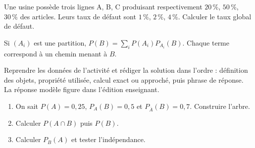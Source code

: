     \begin{activite}
    Une usine possède trois lignes A, B, C produisant respectivement $20\,\%$, $50\,\%$, $30\,\%$ des articles. Leurs taux de défaut sont $1\,\%$, $2\,\%$, $4\,\%$. Calculer le taux global de défaut.
    \begin{center}\end{center}
    \end{activite}

    \begin{traceecrite}Si $(A_i)$ est une partition, $P(B)=\sum_i P(A_i)P_{A_i}(B)$. Chaque terme correspond à un chemin menant à $B$.\end{traceecrite}

    \begin{exemple}
    Reprendre les données de l'activité et rédiger la solution dans l'ordre : définition des objets, propriété utilisée, calcul exact ou approché, puis phrase de réponse. La réponse modèle figure dans l'édition enseignant.
    \end{exemple}

    \begin{exercice}[-- essentiel]
    \begin{enumerate}\item On sait $P(A)=0{,}25$, $P_A(B)=0{,}5$ et $P_{\overline A}(B)=0{,}7$. Construire l'arbre.\item Calculer $P(A\cap B)$ puis $P(B)$.\item Calculer $P_B(A)$ et tester l'indépendance.\end{enumerate}
    \end{exercice}


